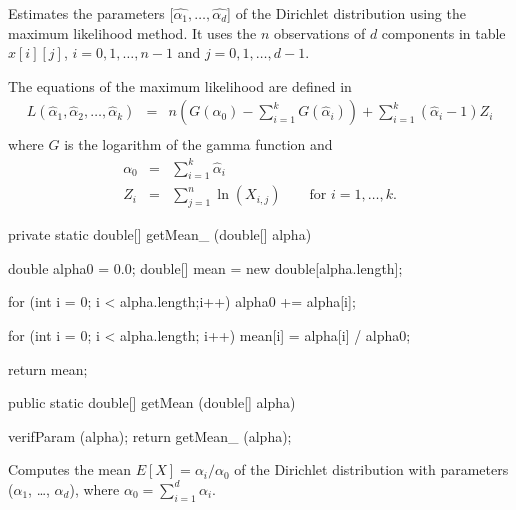 \begin{tabb}
   Estimates the parameters [$\hat{\alpha_1},\ldots,\hat{\alpha_d}$]
   of the Dirichlet distribution using the maximum likelihood method. It uses the
   $n$ observations of $d$ components in table $x[i][j]$, $i = 0, 1, \ldots, n-1$
   and $j = 0, 1, \ldots, d-1$.
   \begin{detailed}
   The equations of the maximum likelihood are defined in \cite[Technical appendix]{ccAVR04a}
   \begin{eqnarray*}
      L(\hat\alpha_1,\hat\alpha_2,\ldots,\hat\alpha_k) & = & n \left( G(\alpha_0) - \sum_{i=1}^{k} G(\hat\alpha_i) \right) + \sum_{i=1}^{k} (\hat\alpha_i - 1) Z_i\\
   \end{eqnarray*}
   where  $G$  is the logarithm of the gamma function and
   \begin{eqnarray*}
      \alpha_0 & = & \sum_{i=1}^{k} \hat\alpha_i\\
      Z_i & = & \sum_{j=1}^{n} \ln (X_{i,j}) \qquad \mbox{for }i=1,\ldots,k.
   \end{eqnarray*}
   \end{detailed}
\end{tabb}
\begin{htmlonly}
\end{htmlonly}
\begin{code}\begin{hide}

   private static double[] getMean_ (double[] alpha) {
      double alpha0 = 0.0;
      double[] mean = new double[alpha.length];

      for (int i = 0; i < alpha.length;i++)
         alpha0 += alpha[i];

      for (int i = 0; i < alpha.length; i++)
         mean[i] = alpha[i] / alpha0;

      return mean;
   }
\end{hide}

   public static double[] getMean (double[] alpha)\begin{hide} {
      verifParam (alpha);
      return getMean_ (alpha);
   }\end{hide}
\end{code}
\begin{tabb}
   Computes the mean $E[X] = \alpha_i / \alpha_0$ of the Dirichlet distribution
   with parameters ($\alpha_1$, \ldots, $\alpha_d$), where $\alpha_0 = \sum_{i=1}^{d} \alpha_i$.
\end{tabb}
